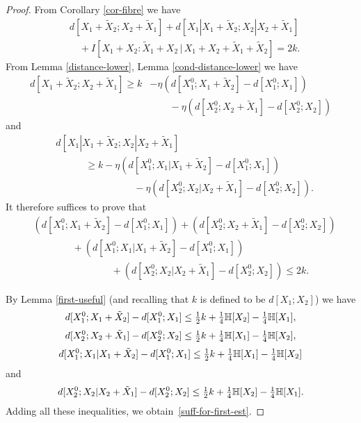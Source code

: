 \begin{proof}  From Corollary \ref{cor-fibre} we have
  \begin{align}
    &   d[X_1+\tilde X_2;X_2+\tilde X_1] + d[X_1|X_1+\tilde X_2; X_2|X_2+\tilde X_1] \\
    &\quad + I[ X_1+ X_2 : \tilde X_1 + X_2 \,|\, X_1 + X_2 + \tilde X_1 + \tilde X_2 ] = 2k.\label{second-main}
    \end{align}
From Lemma \ref{distance-lower}, Lemma \ref{cond-distance-lower} we have
\begin{align*}
  d[X_1+\tilde X_2; X_2+\tilde X_1] \geq k &- \eta (d[X^0_1; X_1+\tilde X_2] - d[X^0_1; X_1]) \\& \qquad- \eta (d[X^0_2; X_2+\tilde X_1] - d[X^0_2; X_2])
\end{align*}
and
\begin{align}
  \nonumber
  & d[X_1|X_1+\tilde X_2; X_2|X_2+\tilde X_1]  \\ \nonumber & \qquad\quad \geq k - \eta (d[X^0_1; X_1 | X_1 + \tilde X_2] - d[X^0_1; X_1]) \\
  & \qquad\qquad\qquad\qquad  - \eta(d[X^0_2; X_2 | X_2 + \tilde X_1] - d[X^0_2; X_2]).\label{second-tc2}
\end{align}
It therefore suffices to prove that
\begin{align}
\nonumber
&(d[X_1^0;X_1+\tilde X_2]-d[X_1^0;X_1]) + (d[X_2^0;X_2+\tilde X_1]-d[X_2^0;X_2])\\
&\qquad \qquad +(d[X_1^0;X_1|X_1+\tilde X_2]-d[X_1^0;X_1]) \nonumber \\ & \qquad \qquad \qquad \qquad  +(d[X_2^0; X_2|X_2+\tilde X_1]-d[X_2^0;X_2]) \leq 2k.
\label{suff-for-first-est}
\end{align}

By Lemma \ref{first-useful} (and recalling that $k$ is defined to be $d[X_1;X_2]$) we have
\[ d[X^0_1; X_1+\tilde X_2] - d[X^0_1; X_1] \leq \tfrac{1}{2} k + \tfrac{1}{4} \mathbb{H}[X_2] - \tfrac{1}{4} \mathbb{H}[X_1],\] \[  d[X^0_2;X_2+\tilde X_1] - d[X^0_2; X_2] \leq \tfrac{1}{2} k + \tfrac{1}{4} \mathbb{H}[X_1] - \tfrac{1}{4} \mathbb{H}[X_2],\]
\begin{equation}  d[X_1^0;X_1|X_1+\tilde X_2] - d[X_1^0;X_1] \leq \tfrac{1}{2} k + \tfrac{1}{4} \mathbb{H}[X_1] - \tfrac{1}{4} \mathbb{H}[X_2]                                 \label{second-dist1}
\end{equation}
and
\begin{equation}
  \label{second-dist2}
  d[X_2^0; X_2|X_2+\tilde X_1] - d[X_2^0; X_2] \leq \tfrac{1}{2}k + \tfrac{1}{4} \mathbb{H}[X_2] - \tfrac{1}{4} \mathbb{H}[X_1].
\end{equation}
Adding all these inequalities, we obtain~\eqref{suff-for-first-est}.
\end{proof}

